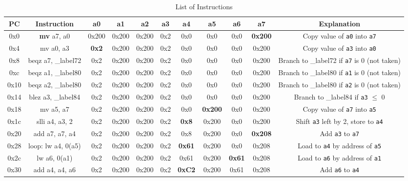 \documentclass[12pt, a4paper]{article}
\begin{document}
\centering
\begin{landscape}
\begin{table}[!ht]
\caption{List of Instructions}
\centering
\label{execution_table}
\begin{tabular}{c | c c c c c c c c c | c}
\textbf{PC} & \textbf{Instruction} & \textbf{a0} & \textbf{a1} & \textbf{a2} & \textbf{a3} & \textbf{a4} & \textbf{a5} & \textbf{a6} & \textbf{a7} & \textbf{Explanation}\\
\hline \hline  0x0 & \textbf{mv} a7, a0 & 0x200 & 0x200 & 0x200 & 0x2 & 0x0 & 0x0 & 0x0 & \textbf{0x200} & Copy value of \texttt{a0} into \texttt{a7}\\
\hline  0x4 &mv a0, a3  & \textbf{0x2} & 0x200 & 0x200 & 0x2 & 0x0 & 0x0 & 0x0 &0x200 & Copy value of \texttt{a3} into \texttt{a0}\\
\hline  0x8 &beqz a7, \_label72     & 0x2 & 0x200 & 0x200 &0x2&0x0&0x0&0x0&0x200& Branch to \_label72 if \texttt{a7} is 0  (not taken)\\
\hline 0xc &beqz a1, \_label80     & 0x2 & 0x200 &0x200&0x2&0x0&0x0&0x0&0x200& Branch to \_label80 if \texttt{a1} is 0 (not taken) \\
\hline  0x10 & beqz a2, \_label80   & 0x2 & 0x200 & 0x200 & 0x2 & 0x0 & 0x0 & 0x0 & 0x200 & Branch to \_label80 if \texttt{a2} is 0  (not taken)\\
\hline  0x14 & blez a3, \_label84    & 0x2 & 0x200 & 0x200 & 0x2 & 0x0 & 0x0 & 0x0 & 0x200 & Branch to \_label84 if \texttt{a3} $\leq$ 0\\
\hline  0x18 & mv a5, a7 & 0x2 & 0x200 & 0x200 & 0x2 & 0x0 & \textbf{0x200} & 0x0 & 0x200 & Copy value of \texttt{a7} into \texttt{a5}  \\
\hline 0x1c & slli a4, a3, 2    & 0x2 & 0x200 & 0x200 & 0x2 & \textbf{0x8} & 0x200 & 0x0 & 0x200 & Shift \texttt{a3} left by 2, store to \texttt{a4}\\
\hline  0x20 & add a7, a7, a4     & 0x2 & 0x200 & 0x200 & 0x2 & 0x8 & 0x200 & 0x0 & \textbf{0x208} & Add \texttt{a3} to \texttt{a7} \\
\hline  0x28 & loop: lw a4, 0(a5)     & 0x2 & 0x200 & 0x200 & 0x2 & \textbf{0x61} & 0x200 & 0x0 & 0x208 & Load to \texttt{a4} by address of \texttt{a5}\\
\hline  0x2c & lw a6, 0(a1)     & 0x2 & 0x200 & 0x200 & 0x2 & 0x61 & 0x200 & \textbf{0x61} & 0x208 & Load to \texttt{a6} by address of \texttt{a1}\\
\hline  0x30 & add a4, a4, a6     & 0x2 & 0x200 & 0x200 & 0x2 & \textbf{0xC2} & 0x200 & 0x61 & 0x208 & Add \texttt{a6} to \texttt{a4}\\

\end{tabular}
\end{table}
\end{landscape}
\end{document}
